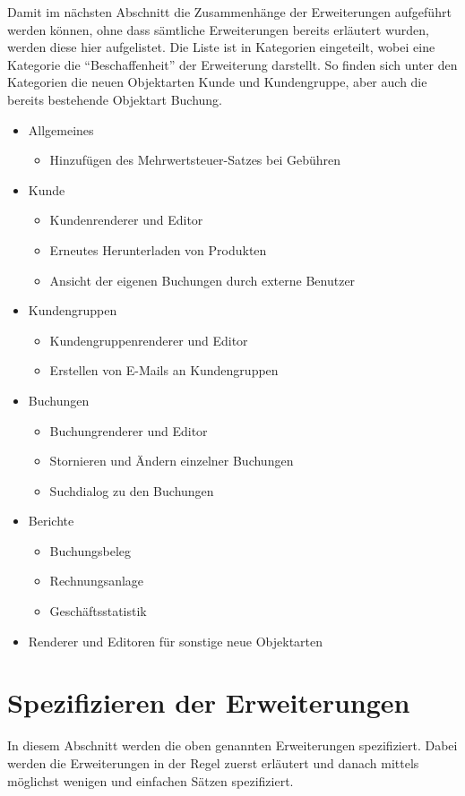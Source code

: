 Damit im nächsten Abschnitt die Zusammenhänge der Erweiterungen aufgeführt werden können, ohne dass sämtliche Erweiterungen bereits erläutert wurden, werden diese hier aufgelistet.
Die Liste ist in Kategorien eingeteilt, wobei eine Kategorie die "`Beschaffenheit"' der Erweiterung darstellt. So finden sich unter den Kategorien die neuen Objektarten Kunde und Kundengruppe, aber auch die bereits bestehende Objektart Buchung. 
\begin{itemize}
	\item Allgemeines
	\begin{itemize}
		\item Hinzufügen des Mehrwertsteuer-Satzes bei Gebühren
	\end{itemize}
	\item Kunde
	\begin{itemize}
		\item Kundenrenderer und Editor
		\item Erneutes Herunterladen von Produkten
		\item Ansicht der eigenen Buchungen durch externe Benutzer
	\end{itemize}
	\item Kundengruppen
	\begin{itemize}
		\item Kundengruppenrenderer und Editor
		\item Erstellen von E-Mails an Kundengruppen
	\end{itemize}
	\item Buchungen
	\begin{itemize}
		\item Buchungrenderer und Editor
		\item Stornieren und Ändern einzelner Buchungen
		\item Suchdialog zu den Buchungen
	\end{itemize}
	\item Berichte
	\begin{itemize}
		\item Buchungsbeleg
		\item Rechnungsanlage
		\item Geschäftsstatistik
	\end{itemize}	 
	\item Renderer und Editoren für sonstige neue Objektarten
\end{itemize}

\section{Spezifizieren der Erweiterungen}
In diesem Abschnitt werden die oben genannten Erweiterungen spezifiziert. Dabei werden die Erweiterungen in der Regel zuerst erläutert und danach mittels möglichst wenigen und einfachen Sätzen spezifiziert.

